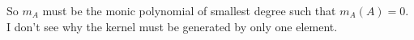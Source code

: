 So $m_A$ must be the monic polynomial of smallest degree such that $m_A(A)=0$. I don't see why the kernel must be generated by only one element.